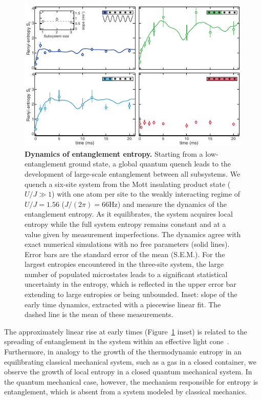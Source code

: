 \begin{figure}[t!]
	\centering
	\includegraphics[scale=1.5]{figures/ETH_EE_dynamics.pdf}
	\caption{{\bf Dynamics of entanglement entropy. } Starting from a low-entanglement ground state, a global quantum quench leads to the development of large-scale entanglement between all subsystems. We quench a six-site system from the Mott insulating product state ($U/J\gg 1$) with one atom per site to the weakly interacting regime of $U/J=1.56$ ($J/(2\pi) = 66\mathrm{Hz}$) and measure the dynamics of the entanglement entropy. As it equilibrates, the system acquires local entropy while the full system entropy remains constant and at a value given by measurement imperfections. The dynamics agree with exact numerical simulations with no free parameters (solid lines). Error bars are the standard error of the mean (S.E.M.). For the largest entropies encountered in the three-site system, the large number of populated microstates leads to a significant statistical uncertainty in the entropy, which is reflected in the upper error bar extending to large entropies or being unbounded. Inset: slope of the early time dynamics, extracted with a piecewise linear fit. The dashed line is the mean of these measurements.}
	\label{fig:EEDyn}
\end{figure} 

The approximately linear rise at early times (Figure~\ref{fig:EEDyn} inset) is related to the spreading of entanglement in the system within an effective light cone~\cite{Calabrese2005,Cheneau2012,Richerme2014}. Furthermore, in analogy to the growth of the thermodynamic entropy in an equilibrating classical mechanical system, such as a gas in a closed container, we observe the growth of local entropy in a closed quantum mechanical system. In the quantum mechanical case, however, the mechanism responsible for entropy is entanglement, which is absent from a system modeled by classical mechanics.

